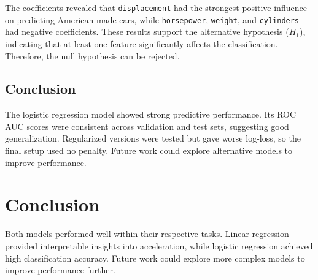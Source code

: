 \documentclass[a4paper, twocolumn]{article}
\begin{document}
The coefficients revealed that \texttt{displacement} had the strongest positive influence on predicting American-made cars, while \texttt{horsepower}, \texttt{weight}, and \texttt{cylinders} had negative coefficients. These results support the alternative hypothesis ($H_1$), indicating that at least one feature significantly affects the classification. Therefore, the null hypothesis can be rejected.

\subsection{Conclusion}
The logistic regression model showed strong predictive performance. Its ROC AUC scores were consistent across validation and test sets, suggesting good generalization. Regularized versions were tested but gave worse log-loss, so the final setup used no penalty. Future work could explore alternative models to improve performance.

\section{Conclusion}
Both models performed well within their respective tasks. Linear regression provided interpretable insights into acceleration, while logistic regression achieved high classification accuracy. Future work could explore more complex models to improve performance further.
\end{document}
